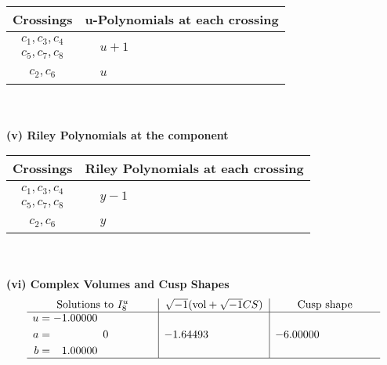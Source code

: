 \documentclass[1p]{elsarticle_modified}
\theoremstyle{definition}
\newcommand{\I}{\sqrt{-1}}
\begin{document}
\begin{tabular}{m{50pt}|m{274pt}}
Crossings & \hspace{64pt}u-Polynomials at each crossing \\
\hline $$\begin{aligned}c_{1},c_{3},c_{4}\\c_{5},c_{7},c_{8}\end{aligned}$$&$\begin{aligned}
&u+1
\end{aligned}$\\
\hline $$\begin{aligned}c_{2},c_{6}\end{aligned}$$&$\begin{aligned}
&u
\end{aligned}$\\
\hline
\end{tabular}\\~\\
\newpage\renewcommand{\arraystretch}{1}
\flushleft \textbf{(v) Riley Polynomials at the component}\newline \\
\begin{tabular}{m{50pt}|m{274pt}}
Crossings & \hspace{64pt}Riley Polynomials at each crossing \\
\hline $$\begin{aligned}c_{1},c_{3},c_{4}\\c_{5},c_{7},c_{8}\end{aligned}$$&$\begin{aligned}
&y-1
\end{aligned}$\\
\hline $$\begin{aligned}c_{2},c_{6}\end{aligned}$$&$\begin{aligned}
&y
\end{aligned}$\\
\hline
\end{tabular}\\~\\
\newpage\flushleft \textbf{(vi) Complex Volumes and Cusp Shapes}
$$\begin{array}{c|c|c}  
\text{Solutions to }I^u_{8}& \I (\text{vol} + \sqrt{-1}CS) & \text{Cusp shape}\\
 \hline 
\begin{aligned}
u &= -1.00000\phantom{ +0.000000I} \\
a &= \phantom{-0.000000 } 0 \\
b &= \phantom{-}1.00000\phantom{ +0.000000I}\end{aligned}
 & -1.64493\phantom{ +0.000000I} & -6.00000\phantom{ +0.000000I}\\
 \hline 
 \end{array}$$\newpage\newpage\renewcommand{\arraystretch}{1}
\end{document}

